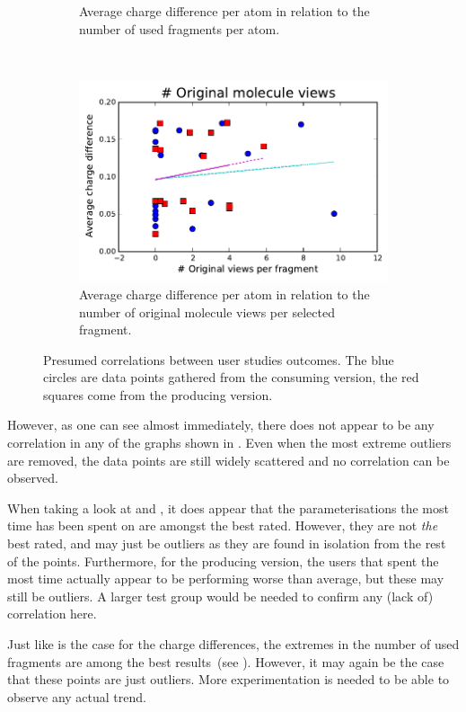 \begin{figure}[h!]
\begin{subfigure}[t]{0.48\textwidth}
\caption{Average charge difference per atom in relation to the number of used fragments per atom.}
\end{subfigure}%
~
\begin{subfigure}[t]{0.48\textwidth}
\centering
\includegraphics[width=\textwidth]{img/graphs/3a_03.pdf}
\caption{Average charge difference per atom in relation to the number of original molecule views per selected fragment.}
\end{subfigure}
\caption{Presumed correlations between user studies outcomes. The blue circles are data points gathered from the consuming version, the red squares come from the producing version.}
\end{figure}

However, as one can see almost immediately, there does not appear to be any correlation in any of the graphs shown in . Even when the most extreme outliers are removed, the data points are still widely scattered and no correlation can be observed.

When taking a look at  and , it does appear that the parameterisations the most time has been spent on are amongst the best rated. However, they are not \emph{the} best rated, and may just be outliers as they are found in isolation from the rest of the points. Furthermore, for the producing version, the users that spent the most time actually appear to be performing worse than average, but these may still be outliers. A larger test group would be needed to confirm any (lack of) correlation here.

Just like is the case for the charge differences, the extremes in the number of used fragments are among the best results~(see ). However, it may again be the case that these points are just outliers. More experimentation is needed to be able to observe any actual trend.

